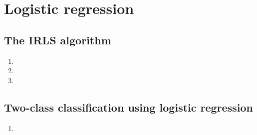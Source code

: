 \documentclass[a4paper,10pt]{article}
\numberwithin{equation}{section} %
\numberwithin{figure}{section} %
\numberwithin{table}{section} %
\theoremstyle{mytheor}
\begin{document}
\section{Logistic regression}
\subsection{The IRLS algorithm}
\begin{enumerate}
	\item 
	\item 
	\item 
\end{enumerate}

\subsection{Two-class classification using logistic regression}
\begin{enumerate}
	\item 
\end{enumerate}
\end{document}
